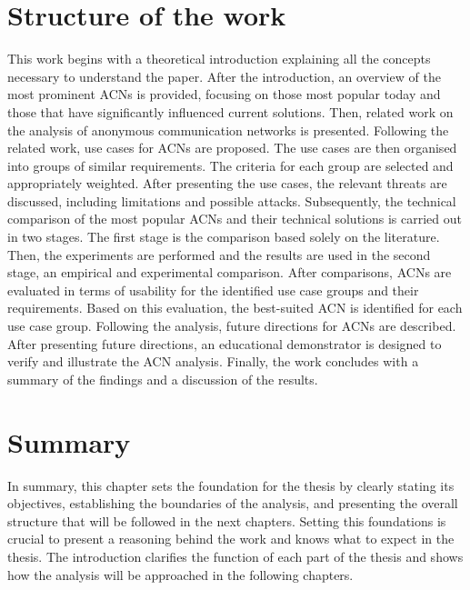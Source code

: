 \section{Structure of the work}
This work begins with a theoretical introduction explaining all the concepts necessary to understand the paper.
After the introduction, an overview of the most prominent ACNs is provided, focusing on those most popular today and those that have significantly influenced current solutions.
Then, related work on the analysis of anonymous communication networks is presented.
Following the related work, use cases for ACNs are proposed. The use cases are then organised into groups of similar requirements. The criteria for each group are selected and appropriately weighted.
After presenting the use cases, the relevant threats are discussed, including limitations and possible attacks.
Subsequently, the technical comparison of the most popular ACNs and their technical solutions is carried out in two stages. The first stage is the comparison based solely on the literature. Then, the experiments are performed and the results are used in the second stage, an empirical and experimental comparison.
After comparisons, ACNs are evaluated in terms of usability for the identified use case groups and their requirements. Based on this evaluation, the best-suited ACN is identified for each use case group.
Following the analysis, future directions for ACNs are described.
After presenting future directions, an educational demonstrator is designed to verify and illustrate the ACN analysis.
Finally, the work concludes with a summary of the findings and a discussion of the results.

\section{Summary}
In summary, this chapter sets the foundation for the thesis by clearly stating its objectives, establishing the boundaries of the analysis, and presenting the overall structure that will be followed in the next chapters. Setting this foundations is crucial to present a reasoning behind the work and knows what to expect in the thesis. The introduction clarifies the function of each part of the thesis and shows how the analysis will be approached in the following chapters.

